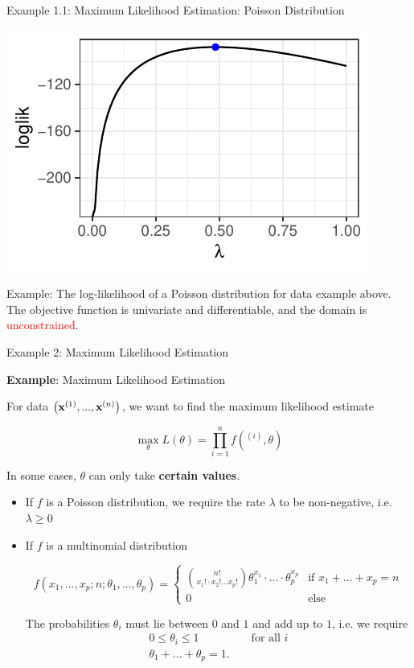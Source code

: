 \begin{vbframe}{Example 1.1: Maximum Likelihood Estimation: Poisson Distribution}
\begin{center}
	\includegraphics[height=0.3\textwidth, keepaspectratio]{figure_man/ml_poisson_example_2.pdf} \\
	\begin{footnotesize}
		Example: The log-likelihood of a Poisson distribution for data example above. The objective function is univariate and differentiable, and the domain is \textcolor{red}{unconstrained}.
	\end{footnotesize}
\end{center}


\end{vbframe}

\begin{vbframe}{Example 2: Maximum Likelihood Estimation}

\textbf{Example}: Maximum Likelihood Estimation

\lz

For data $\left(\mathbf{x}^{(1)}, ..., \mathbf{x}^{(n)}\right)$, we want to find the maximum likelihood estimate

$$
\max_\theta L(\theta) = \prod_{i = 1}^n f(^{(i)}, \theta)
$$

In some cases, $\theta$ can only take \textbf{certain values}. 

\lz 

\begin{itemize}
\item If $f$ is a Poisson distribution, we require the rate $\lambda$ to be non-negative, i.e. $\lambda \ge 0$

  \item If $f$ is a multinomial distribution

\begin{footnotesize}
  $$
  f(x_1, ..., x_p; n; \theta_1, ..., \theta_p) = \begin{cases} \binom{n!}{x_1! \cdot x_2! ... x_p!} \theta_1^{x_1} \cdot ... \cdot \theta_p^{x_p} & \text{if } x_1 + ... + x_p = n \\ 0 & \text{else}
  \end{cases}
  $$
\end{footnotesize}

The probabilities $\theta_i$ must lie between $0$ and $1$ and add up to $1$, i.e. we require 
\begin{eqnarray*}
	0 \le \theta_i \le 1 && \text{ for all } i \\
	 \theta_1 + ... + \theta_p = 1. &&
\end{eqnarray*}

\end{itemize}

\end{vbframe}

